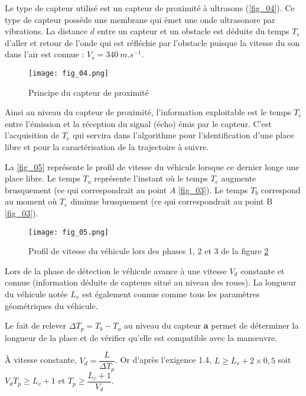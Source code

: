 Le type de capteur utilisé est un capteur de proximité à ultrasons (\autoref{fig_04}). Ce type de capteur possède une
membrane qui émet une onde ultrasonore par vibrations. La distance $d$ entre un capteur et un obstacle est
déduite du temps $T_e$ d’aller et retour de l’onde qui est réfléchie par l’obstacle puisque la vitesse du son dans
l’air est connue : $V_s = \SI{340}{m.s^{-1}}$.

\begin{figure}[H]
\centering
\texttt{[image: fig\_04.png]}
\caption{Principe du capteur de proximité \label{fig_04}}
\end{figure}

Ainsi au niveau du capteur de proximité, l’information exploitable est le temps $T_e$
entre l’émission et la réception
du signal (écho) émis par le capteur. C’est l’acquisition de $T_e$ qui servira dans l’algorithme pour l’identification
d’une place libre et pour la caractérisation de la trajectoire à suivre.

La \autoref{fig_05} représente le profil de vitesse du véhicule lorsque ce dernier longe une place libre. Le temps $T_a$
représente l’instant où le temps $T_e$ augmente brusquement (ce qui correspondrait au point $A$ \autoref{fig_03}). Le temps
$T_b$
correspond au moment où $T_e$ diminue brusquement (ce qui correspondrait au point B \autoref{fig_03}).

\begin{figure}[H]
\centering
\texttt{[image: fig\_05.png]}
\caption{Profil de vitesse du véhicule lors des phases 1, 2 et 3 de la figure \ref{fig_05} \label{fig_05}}
\end{figure}

Lors de la phase de détection le véhicule avance à une vitesse $V_d$ constante et connue (information déduite de
capteurs situé au niveau des roues). La longueur du véhicule notée $L_v$
est également connue comme tous les
paramètres géométriques du véhicule.

Le fait de relever $\Delta T_p = T_b - T_a$ au niveau du capteur \textbf{a} permet de déterminer la longueur de la place et de vérifier qu’elle est compatible avec la manœuvre.

\ifprof
\begin{corrige}
À vitesse constante, $V_d = \dfrac{L}{\Delta T_p}$. Or d'après l'exigence 1.4, $L \geq L_v + 2\times 0,5$ soit 
$V_dT_p \geq L_v + 1$ et $T_p \geq\dfrac{ L_v + 1}{V_d}$.
\end{corrige}
\else
\fi

